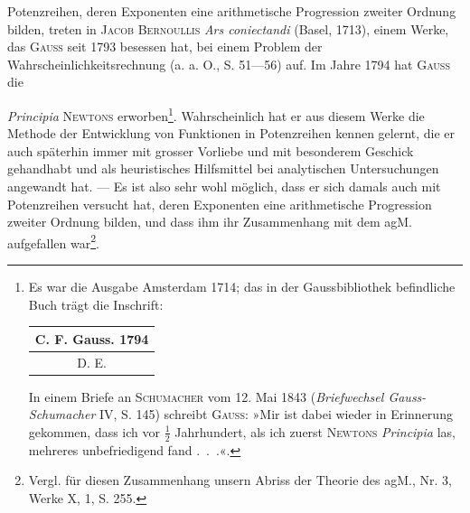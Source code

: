 Potenzreihen, deren Exponenten eine arithmetische Progression zweiter
Ordnung bilden, treten in \textsc{Jacob Bernoullis} \textit{Ars coniectandi} (Basel, 1713), einem
Werke, das \textsc{Gauss} seit 1793 besessen hat, bei einem Problem der Wahrscheinlichkeitsrechnung
(a. a. O., S. 51—56) auf. Im Jahre 1794 hat \textsc{Gauss} die\par
\clearpage{}
\noindent \textit{Principia} \textsc{Newtons} erworben\footnote{Es war die Ausgabe Amsterdam 1714; das in der Gaussbibliothek befindliche Buch trägt die Inschrift:
\begin{center}\begin{tabular}{c}C. F. Gauss. 1794\\\hline D. E.\end{tabular}\end{center}
\noindent In einem Briefe an \textsc{Schumacher} vom 12. Mai 1843 (\textit{Briefwechsel Gauss-Schumacher} IV, S. 145) schreibt \textsc{Gauss}: »Mir ist dabei wieder in Erinnerung gekommen, dass ich vor \(\frac12\) Jahrhundert, als ich zuerst \textsc{Newtons} \textit{Principia} las, mehreres unbefriedigend fand .\ .\ .«.}. Wahrscheinlich hat er aus diesem Werke die
Methode der Entwicklung von Funktionen in Potenzreihen kennen gelernt, die
er auch späterhin immer mit grosser Vorliebe und mit besonderem Geschick
gehandhabt und als heuristisches Hilfsmittel bei analytischen Untersuchungen
angewandt hat. — Es ist also sehr wohl möglich, dass er sich damals auch
mit Potenzreihen versucht hat, deren Exponenten eine arithmetische Progression
zweiter Ordnung bilden, und dass ihm ihr Zusammenhang mit dem
agM. aufgefallen war\footnote{Vergl. für diesen Zusammenhang unsern Abriss der Theorie des agM., Nr. 3, Werke X, 1, S. 255.}.

